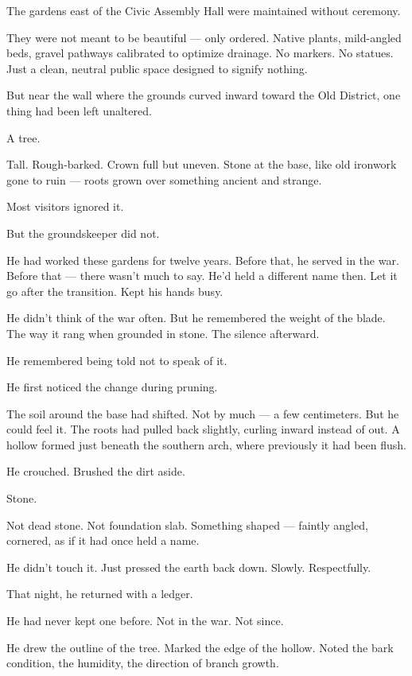 \documentclass[12pt]{article}
\begin{document}
The gardens east of the Civic Assembly Hall were maintained without ceremony.

They were not meant to be beautiful --- only ordered. Native plants, mild-angled beds, gravel pathways calibrated to optimize drainage. No markers. No statues. Just a clean, neutral public space designed to signify nothing.

But near the wall where the grounds curved inward toward the Old District, one thing had been left unaltered.

A tree.

Tall. Rough-barked. Crown full but uneven. Stone at the base, like old ironwork gone to ruin --- roots grown over something ancient and strange.

Most visitors ignored it.

But the groundskeeper did not.

He had worked these gardens for twelve years. Before that, he served in the war. Before that --- there wasn’t much to say. He’d held a different name then. Let it go after the transition. Kept his hands busy.

He didn’t think of the war often. But he remembered the weight of the blade. The way it rang when grounded in stone. The silence afterward.

He remembered being told not to speak of it.

\vspace{1em}

He first noticed the change during pruning.

The soil around the base had shifted. Not by much --- a few centimeters. But he could feel it. The roots had pulled back slightly, curling inward instead of out. A hollow formed just beneath the southern arch, where previously it had been flush.

He crouched. Brushed the dirt aside.

Stone.

Not dead stone. Not foundation slab. Something shaped --- faintly angled, cornered, as if it had once held a name.

He didn’t touch it. Just pressed the earth back down. Slowly. Respectfully.

\vspace{1em}

That night, he returned with a ledger.

He had never kept one before. Not in the war. Not since.

He drew the outline of the tree. Marked the edge of the hollow. Noted the bark condition, the humidity, the direction of branch growth.
\end{document}

